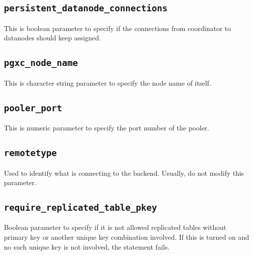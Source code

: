 
\subsection*{\label{subsec:persistentDatanodeConnections}\texttt{persistent\_datanode\_connections}}

  This is boolean parameter to specify if the connections from coordinator to datanodes should keep assigned.



\subsection*{\label{subsec:pgxcNodename}\texttt{pgxc\_node\_name}}

  This is character string parameter to specify the node name of itself.

\subsection*{\label{subsec:poolerPort}\texttt{pooler\_port}}

This is numeric parameter to specify the port number of the pooler.



\subsection*{\label{subsec:remoteType}\texttt{remotetype}}

  Used to identify what is connecting to the backend.
  Usually, do not modify this parameter.



\subsection*{\label{subsec:requireRepTablePkey}\texttt{require\_replicated\_table\_pkey}}

  Boolean parameter to specify if it is not allowed replicated tables without primary key or another unique key combination involved.
  If this is turned on and no such unique key is not involved, the statement fails.


